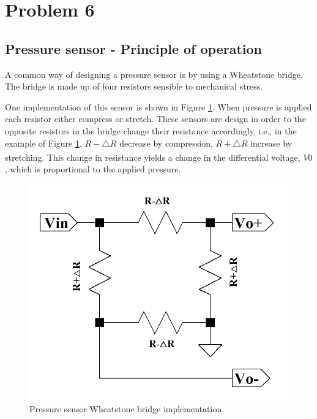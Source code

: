 \section{Problem 6}

\subsection{Pressure sensor - Principle of operation}

A common way of designing a pressure sensor is by using a Wheatstone bridge. The bridge is made up of four resistors sensible to mechanical stress. 

One implementation of this sensor is shown in Figure \ref{fig:wheatstone_bridge}. When pressure is applied each resistor either compress or stretch. These sensors are design in order to the opposite resistors in the bridge change their resistance accordingly, i.e., in the example of Figure \ref{fig:wheatstone_bridge}, $R - \triangle R$ decrease by compression, $R + \triangle R$ increase by stretching\textsuperscript{\cite{TI-Design-Resistive-Bridge-Pressure-Sensor}}. This change in resistance yields a change in the differential voltage, $V0$, which is proportional to the applied pressure.

\begin{figure}[ht]
    \centering
    \includegraphics*[scale = 0.4]{images/wheatstone-bridge.png}
    \caption{Pressure sensor Wheatstone bridge implementation.} 
    \label{fig:wheatstone_bridge}
\end{figure}

